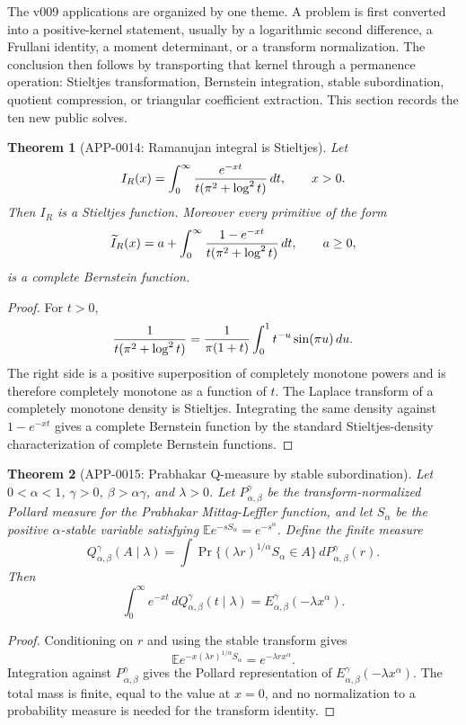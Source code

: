 \documentclass[11pt]{article}
\numberwithin{equation}{section}
\newtheorem{theorem}{Theorem}[section]
\theoremstyle{definition}
\theoremstyle{remark}
\newcommand{\1}{\mathbf 1}
\begin{document}
The v009 applications are organized by one theme.  A problem is first converted
into a positive-kernel statement, usually by a logarithmic second difference, a
Frullani identity, a moment determinant, or a transform normalization.  The
conclusion then follows by transporting that kernel through a permanence
operation: Stieltjes transformation, Bernstein integration, stable
subordination, quotient compression, or triangular coefficient extraction.  This
section records the ten new public solves.

\begin{theorem}[APP-0014: Ramanujan integral is Stieltjes]
\label{thm:app14-ramanujan-stieltjes}
Let
\[
  I_R(x)=\int_0^\infty {e^{-xt}\over t(\pi^2+\log^2 t)}\,dt,
  \qquad x>0 .
\]
Then \(I_R\) is a Stieltjes function.  Moreover every primitive of the form
\[
  \widetilde I_R(x)=a+\int_0^\infty
       {1-e^{-xt}\over t(\pi^2+\log^2 t)}\,dt,\qquad a\ge0,
\]
is a complete Bernstein function.
\end{theorem}

\begin{proof}
For \(t>0\),
\[
 {1\over t(\pi^2+\log^2t)}
   ={1\over \pi(1+t)}\int_0^1 t^{-u}\sin(\pi u)\,du .
\]
The right side is a positive superposition of completely monotone powers and is
therefore completely monotone as a function of \(t\).  The Laplace transform of
a completely monotone density is Stieltjes.  Integrating the same density
against \(1-e^{-xt}\) gives a complete Bernstein function by the standard
Stieltjes-density characterization of complete Bernstein functions.
\end{proof}

\begin{theorem}[APP-0015: Prabhakar Q-measure by stable subordination]
\label{thm:app15-prabhakar-subordination}
Let \(0<\alpha<1\), \(\gamma>0\), \(\beta>\alpha\gamma\), and \(\lambda>0\).
Let \(P_{\alpha,\beta}^{\gamma}\) be the transform-normalized Pollard measure
for the Prabhakar Mittag-Leffler function, and let \(S_\alpha\) be the positive
\(\alpha\)-stable variable satisfying
\(\mathbb E e^{-sS_\alpha}=e^{-s^\alpha}\).  Define the finite measure
\[
  Q_{\alpha,\beta}^{\gamma}(A\mid\lambda)
  =\int \Pr\{(\lambda r)^{1/\alpha}S_\alpha\in A\}\,
       dP_{\alpha,\beta}^{\gamma}(r).
\]
Then
\[
  \int_0^\infty e^{-xt}\,dQ_{\alpha,\beta}^{\gamma}(t\mid\lambda)
  =E_{\alpha,\beta}^{\gamma}(-\lambda x^\alpha).
\]
\end{theorem}

\begin{proof}
Conditioning on \(r\) and using the stable transform gives
\[
 \mathbb E e^{-x(\lambda r)^{1/\alpha}S_\alpha}=e^{-\lambda r x^\alpha}.
\]
Integration against \(P_{\alpha,\beta}^{\gamma}\) gives the Pollard
representation of \(E_{\alpha,\beta}^{\gamma}(-\lambda x^\alpha)\).  The total
mass is finite, equal to the value at \(x=0\), and no normalization to a
probability measure is needed for the transform identity.
\end{proof}
\end{document}
